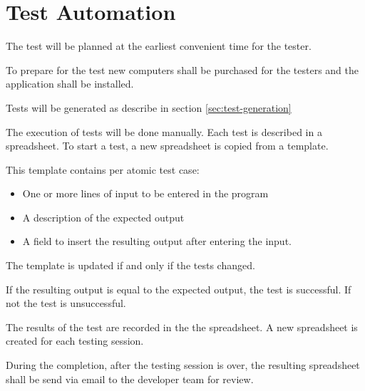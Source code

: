 \documentclass[11pt,a4paper]{article}
\begin{document}




\section{Test Automation}\label{sec:test-automation}

The test will be planned at the earliest convenient time for the
tester.

To prepare for the test new computers shall be purchased for the
testers and the application shall be installed.

Tests will be generated as describe in section \ref{sec:test-generation}

The execution of tests will be done manually. Each test is described
in a spreadsheet. To start a test, a new spreadsheet is copied from a
template.

This template contains per atomic test case:

\begin{itemize}
\item One or more lines of input to be entered in the program
\item A description of the expected output %
\item A field to insert the resulting output after entering the input.
\end{itemize}

The template is updated if and only if the tests  changed.

If the resulting output is equal to the expected output, the test is
successful. If not the test is unsuccessful.

The results of the test are recorded in the the spreadsheet. A new
spreadsheet is created for each testing session.

During the completion, after the testing session is over, the resulting spreadsheet shall be
send via email to the developer team for review.
\end{document}
